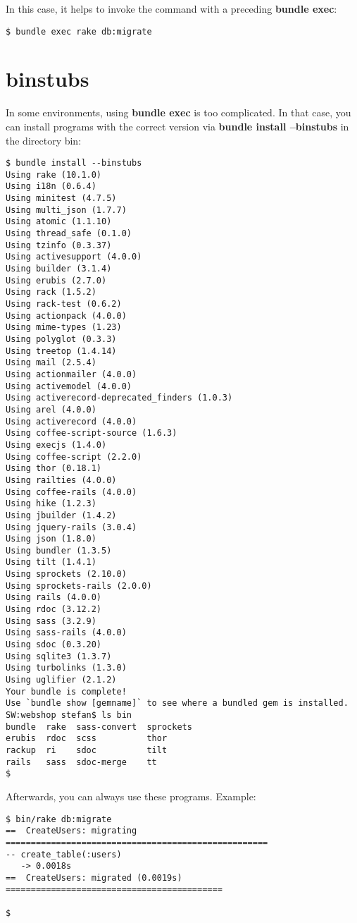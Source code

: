 \documentclass[a4paper]{book}
\newcounter{tab}[chapter]
\begin{document}
In this case, it helps to invoke the command with a preceding \textbf{bundle exec}:

\begin{shaded}\begin{verbatim}
$ bundle exec rake db:migrate
\end{verbatim}\end{shaded}

\section{binstubs}\label{binstubs}

In some environments, using \textbf{bundle exec} is too complicated. In that case, you can install programs with the correct version via \textbf{bundle install --binstubs} in the directory bin:

\begin{shaded}\begin{verbatim}
$ bundle install --binstubs
Using rake (10.1.0)
Using i18n (0.6.4)
Using minitest (4.7.5)
Using multi_json (1.7.7)
Using atomic (1.1.10)
Using thread_safe (0.1.0)
Using tzinfo (0.3.37)
Using activesupport (4.0.0)
Using builder (3.1.4)
Using erubis (2.7.0)
Using rack (1.5.2)
Using rack-test (0.6.2)
Using actionpack (4.0.0)
Using mime-types (1.23)
Using polyglot (0.3.3)
Using treetop (1.4.14)
Using mail (2.5.4)
Using actionmailer (4.0.0)
Using activemodel (4.0.0)
Using activerecord-deprecated_finders (1.0.3)
Using arel (4.0.0)
Using activerecord (4.0.0)
Using coffee-script-source (1.6.3)
Using execjs (1.4.0)
Using coffee-script (2.2.0)
Using thor (0.18.1)
Using railties (4.0.0)
Using coffee-rails (4.0.0)
Using hike (1.2.3)
Using jbuilder (1.4.2)
Using jquery-rails (3.0.4)
Using json (1.8.0)
Using bundler (1.3.5)
Using tilt (1.4.1)
Using sprockets (2.10.0)
Using sprockets-rails (2.0.0)
Using rails (4.0.0)
Using rdoc (3.12.2)
Using sass (3.2.9)
Using sass-rails (4.0.0)
Using sdoc (0.3.20)
Using sqlite3 (1.3.7)
Using turbolinks (1.3.0)
Using uglifier (2.1.2)
Your bundle is complete!
Use `bundle show [gemname]` to see where a bundled gem is installed.
SW:webshop stefan$ ls bin
bundle  rake  sass-convert  sprockets
erubis  rdoc  scss          thor
rackup  ri    sdoc          tilt
rails   sass  sdoc-merge    tt
$
\end{verbatim}\end{shaded}

Afterwards, you can always use these programs. Example:

\begin{shaded}\begin{verbatim}
$ bin/rake db:migrate
==  CreateUsers: migrating ====================================================
-- create_table(:users)
   -> 0.0018s
==  CreateUsers: migrated (0.0019s) ===========================================

$
\end{verbatim}\end{shaded}
\end{document}
